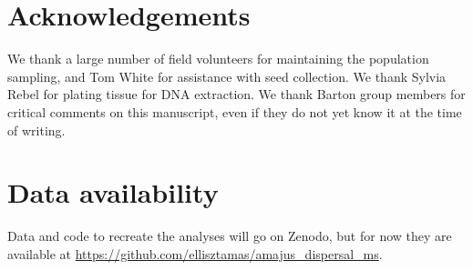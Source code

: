 \documentclass[10pt, a4paper, twocolumn]{article} %
\begin{document}
\section{Acknowledgements}

We thank a large number of field volunteers for maintaining the population sampling, and Tom White for assistance with seed collection. We thank Sylvia Rebel for plating tissue for DNA extraction.
We thank Barton group members for critical comments on this manuscript, even if they do not yet know it at the time of writing.

\section{Data availability}

Data and code to recreate the analyses will go on Zenodo, but for now they are available at \url{https://github.com/ellisztamas/amajus_dispersal_ms}.


\printbibliography[title={Bibliography}] %

\end{document}
